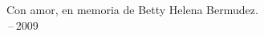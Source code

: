 
\thispagestyle{empty}
{}

\vspace*{3cm}

\begin{center}
    Con amor, en memoria de Betty Helena Bermudez. \\ \,--\,2009
\end{center}

